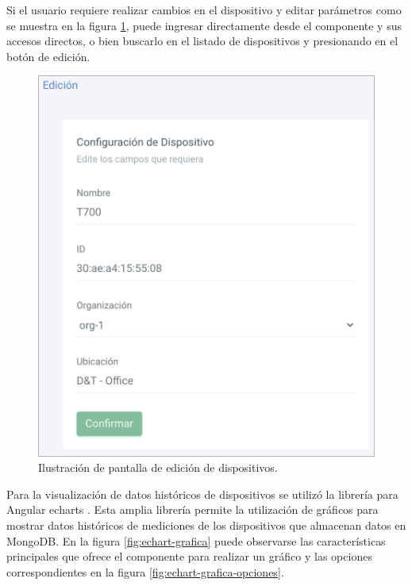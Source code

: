 Si el usuario requiere realizar cambios en el dispositivo y editar parámetros como se muestra en la figura \ref{fig:edicion-dev}, puede ingresar directamente desde el componente y sus accesos directos, o bien buscarlo en el listado de dispositivos y presionando en el botón de edición.
\pagebreak
 \begin{figure}[htpb]
	\centering
	\includegraphics[scale=.55]{./Figures/edicion-dev.png}
	\caption[Pantalla de edición de dispositivos]{Ilustración de pantalla de edición de dispositivos.}
	\label{fig:edicion-dev}
\end{figure}


Para la visualización de datos históricos de dispositivos se utilizó la librería para Angular echarts \citep{WEBSITE:43}. Esta amplia librería permite la utilización de gráficos para mostrar datos históricos de mediciones de los dispositivos que almacenan datos en MongoDB. En la figura \ref{fig:echart-grafica} puede observarse las características principales que ofrece el componente para realizar un gráfico y las opciones correspondientes en la figura \ref{fig:echart-grafica-opciones}.

\newpage


